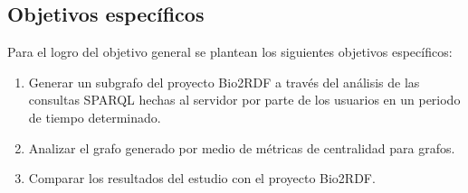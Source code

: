 \subsection{Objetivos específicos}\label{sec:objs:esp}
Para el logro del objetivo general se plantean los siguientes objetivos
específicos:
\begin{enumerate}
  \item
    Generar un subgrafo del proyecto Bio2RDF a través del análisis de las
    consultas SPARQL hechas al servidor por parte de los usuarios en un periodo
    de tiempo determinado.
  \item
    Analizar el grafo generado por medio de métricas de centralidad para grafos.
  \item
    Comparar los resultados del estudio con el proyecto Bio2RDF.
\end{enumerate}
